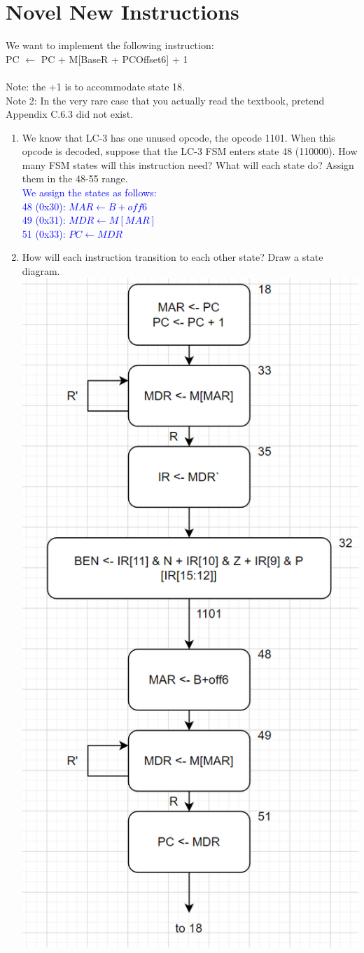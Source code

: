 \documentclass{article}
\begin{document}
   \section{Novel New Instructions}
    We want to implement the following instruction: \\
    PC $\longleftarrow$ PC + M[BaseR + PCOffset6] + 1 \\\\
    Note: the +1 is to accommodate state 18. \\
    Note 2: In the very rare case that you actually read the textbook, pretend Appendix C.6.3 did not exist.\\
    \begin{enumerate}[label=(\alph*),itemsep = 20pt]
        \item We know that LC-3 has one unused opcode, the opcode 1101. When this opcode is decoded, suppose that the LC-3 FSM enters state 48 (110000). How many FSM states will this instruction need? What will each state do? Assign them in the 48-55 range.\\
        \textcolor{blue}{
        We assign the states as follows: \\
        48 (0x30): $MAR \longleftarrow B + off6$\\
        49 (0x31): $MDR \longleftarrow M[MAR]$ \\
        51 (0x33): $PC \longleftarrow MDR$ \\
        }
        
        \item How will each instruction transition to each other state? Draw a state diagram.
        \\
        \includegraphics[width=0.4\linewidth]{figures/newinstr-sol-b.png}


\end{enumerate}
\end{document}
